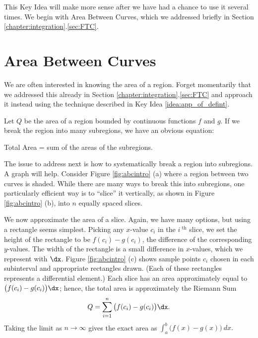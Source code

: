 This Key Idea will make more sense after we have had a chance to use it several times. We begin with Area Between Curves, which we addressed briefly in Section \ref{chapter:integration}.\ref{sec:FTC}.
\clearpage

\section{Area Between Curves}\label{sec:ABC}

We are often interested in knowing the area of a region. Forget momentarily that we addressed this already in Section  \ref{chapter:integration}.\ref{sec:FTC} and approach it instead using the technique described in Key Idea \ref{idea:app_of_defint}. 

Let $Q$ be the area of a region bounded by continuous functions $f$ and $g$. If we break the region into many subregions, we have an obvious equation:

\hfill Total Area = sum of the areas of the subregions. \hfill \null

The issue to address next is how to systematically break a region into subregions. A graph will help. Consider Figure \ref{fig:abcintro} (a) where a region between two curves is shaded. While there are many ways to break this into subregions, one particularly efficient way is to ``slice'' it vertically, as shown in Figure \ref{fig:abcintro} (b), into $n$ equally spaced slices. 

We now approximate the area of a slice. Again, we have many options, but using a rectangle seems simplest. Picking any $x$-value $c_i$ in the $i^\text{ th}$ slice, we set the height of the rectangle to be $f(c_i)-g(c_i)$, the difference of the corresponding $y$-values. The width of the rectangle is a small difference in $x$-values, which we represent with $\dx$. Figure \ref{fig:abcintro} (c) shows sample points $c_i$ chosen in each subinterval and appropriate rectangles drawn. (Each of these rectangles represents a differential element.) Each slice has an area approximately equal to $\big(f(c_i)-g(c_i)\big)\dx$; hence, the total area is approximately the Riemann Sum
$$Q = \sum_{i=1}^n \big(f(c_i)-g(c_i)\big)\dx.$$
Taking the limit as $n\to \infty$ gives the exact area as $\int_a^b \big(f(x)-g(x)\big)\ dx.$


